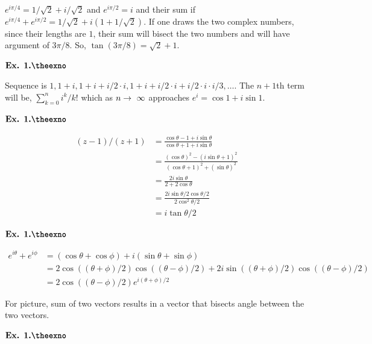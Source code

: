 \documentclass{article}
\def\rto{\ensuremath\rightarrow\ }
\newcounter{exno}
\begin{document}
$e^{i\pi/4} = 1/\sqrt{2}+i/\sqrt{2}$ and $e^{i\pi/2} = i$ and their sum if $e^{i\pi/4}+e^{i\pi/2} = 1/\sqrt{2}+i(1+1/\sqrt{2})$. If one draws the two complex numbers, since their lengths are $1$, their sum will bisect the two numbers and will have argument of $3\pi/8$. So, $\tan(3\pi/8) = \sqrt{2}+1$.

\vspace{0.2in}

${\textbf{Ex. 1.\theexno}}$
\addtocounter{exno}{1}

Sequence is $1, 1+i, 1+i + i/2\cdot i, 1+i+i/2\cdot i+ i/2\cdot i \cdot i/3, \ldots$. The $n+1$th term will be, $\sum_{k=0}^{n}i^{k}/k!$ which as $n\rto \infty$ approaches $e^{i} = \cos 1 + i\sin 1$.

\vspace{0.2in}

${\textbf{Ex. 1.\theexno}}$
\addtocounter{exno}{1}

\begin{align*}
    (z-1)/(z+1) &= \frac{\cos\theta-1+i\sin\theta}{\cos\theta+1+i\sin\theta}\\
    &= \frac{(\cos\theta)^2 - (i\sin\theta+1)^2}{(\cos\theta+1)^2 + (\sin\theta)^2}\\
    &= \frac{2i\sin\theta}{2+2\cos\theta}\\
    &= \frac{2i\sin\theta/2\cos\theta/2}{2\cos^2\theta/2}\\
    &= i\tan\theta/2
\end{align*}

\vspace{0.2in}

${\textbf{Ex. 1.\theexno}}$
\addtocounter{exno}{1}

\begin{align*}
    e^{i\theta} + e^{i\phi} &= (\cos\theta + \cos\phi) + i(\sin\theta + \sin\phi)\\
    &= 2\cos((\theta+\phi)/2)\cos((\theta-\phi)/2) + 2i\sin((\theta+\phi)/2)\cos((\theta-\phi)/2)\\
    &= 2\cos((\theta-\phi)/2)e^{i(\theta+\phi)/2}
\end{align*}

For picture, sum of two vectors results in a vector that bisects angle between the two vectors.

\vspace{0.2in}

${\textbf{Ex. 1.\theexno}}$
\addtocounter{exno}{1}
\end{document}
